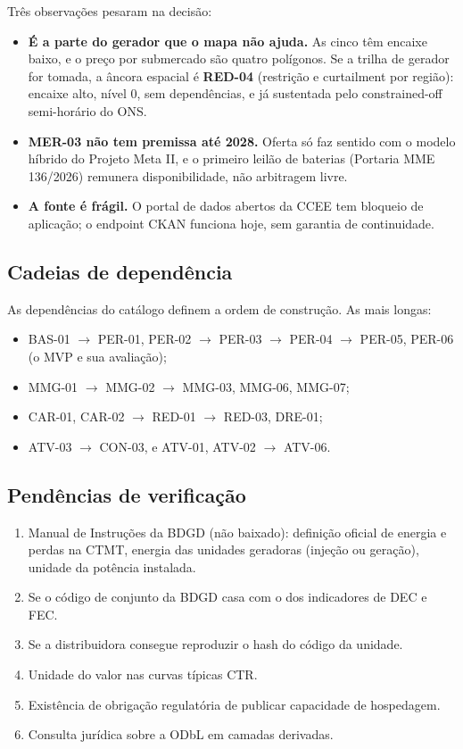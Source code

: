 Três observações pesaram na decisão:
\begin{itemize}
  \item \textbf{É a parte do gerador que o mapa não ajuda.} As cinco têm
    encaixe baixo, e o preço por submercado são quatro polígonos. Se a trilha
    de gerador for tomada, a âncora espacial é \textbf{RED-04} (restrição e
    curtailment por região): encaixe alto, nível 0, sem dependências, e já
    sustentada pelo constrained-off semi-horário do ONS.
  \item \textbf{MER-03 não tem premissa até 2028.} Oferta só faz sentido com
    o modelo híbrido do Projeto Meta II, e o primeiro leilão de baterias
    (Portaria MME 136/2026) remunera disponibilidade, não arbitragem livre.
  \item \textbf{A fonte é frágil.} O portal de dados abertos da CCEE tem
    bloqueio de aplicação; o endpoint CKAN funciona hoje, sem garantia de
    continuidade.
\end{itemize}

\subsection*{Cadeias de dependência}

As dependências do catálogo definem a ordem de construção. As mais longas:
\begin{itemize}
  \item BAS-01 $\rightarrow$ PER-01, PER-02 $\rightarrow$ PER-03 $\rightarrow$
    PER-04 $\rightarrow$ PER-05, PER-06 (o MVP e sua avaliação);
  \item MMG-01 $\rightarrow$ MMG-02 $\rightarrow$ MMG-03, MMG-06, MMG-07;
  \item CAR-01, CAR-02 $\rightarrow$ RED-01 $\rightarrow$ RED-03, DRE-01;
  \item ATV-03 $\rightarrow$ CON-03, e ATV-01, ATV-02 $\rightarrow$ ATV-06.
\end{itemize}

\subsection*{Pendências de verificação}

\begin{enumerate}
  \item Manual de Instruções da BDGD (não baixado): definição oficial de
    energia e perdas na CTMT, energia das unidades geradoras (injeção ou
    geração), unidade da potência instalada.
  \item Se o código de conjunto da BDGD casa com o dos indicadores de DEC e
    FEC.
  \item Se a distribuidora consegue reproduzir o hash do código da unidade.
  \item Unidade do valor nas curvas típicas CTR.
  \item Existência de obrigação regulatória de publicar capacidade de
    hospedagem.
  \item Consulta jurídica sobre a ODbL em camadas derivadas.
\end{enumerate}

